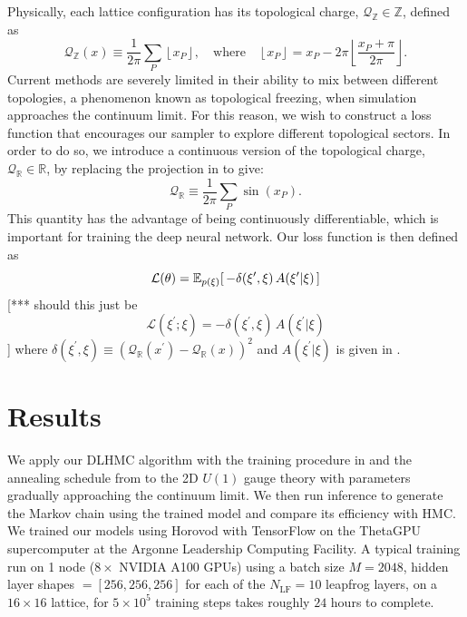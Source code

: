 \documentclass{article} %
\begin{document}
Physically, each lattice configuration has its topological charge, \(\mathcal{Q}_{\mathbb{Z}}\in\mathbb{Z}\), defined as
%
\begin{equation}
      \mathcal{Q}_{\mathbb{Z}}(x) \equiv \frac{1}{2\pi}\sum_{P}\left\lfloor x_{P}\right\rfloor,
   \quad\text{where}\quad \left\lfloor x_{P}\right\rfloor = x_{P} -
   2\pi\left\lfloor\frac{x_{P}+\pi}{2\pi}\right\rfloor.
   \label{eq:intcharge}
\end{equation}
%
Current methods are severely limited in their ability to mix between different topologies, a phenomenon known as
topological freezing, when simulation approaches the continuum limit.
%
For this reason, we wish to construct a loss function that encourages our sampler to explore different topological sectors.
%
In order to do so, we introduce a continuous version of the topological charge,
\(\mathcal{Q}_{\mathbb{R}}\in\mathbb{R}\), by replacing the projection in  to give:
%
\begin{equation}
    \mathcal{Q}_{\mathbb{R}} \equiv \frac{1}{2\pi}\sum_{P}\sin(x_{P}).
    \label{eq:sincharge}
\end{equation}
%
This quantity has the advantage of being continuously differentiable, which is important for training the deep neural
network.
%
Our loss function is then defined as
%
\begin{equation}
   \mathcal{L}(\theta) = \mathbb{E}_{p(\xi)}{%
      \left[\,-\delta(\xi^{\prime}, \xi) \, A(\xi^{\prime}|\xi)\,\right]
   }
\end{equation}
[*** should this just be
\begin{equation}
   \mathcal{L}(\xi^{\prime};\xi) = 
      -\delta(\xi^{\prime}, \xi) \, A(\xi^{\prime}|\xi)
\end{equation}
]
%
where \(\delta(\xi^{\prime}, \xi) \equiv {\left(\mathcal{Q}_{\mathbb{R}}(x^{\prime}) -
\mathcal{Q}_{\mathbb{R}}(x)\right)}^{2}\) and \(A(\xi^{\prime}|\xi)\) is given in .
%
%
\section{\label{sec:results}Results}
%
We apply our DLHMC algorithm with
the training procedure in  and the annealing schedule from 
to the 2D $U(1)$ gauge theory with parameters gradually approaching the continuum limit.
%
We then run inference to generate the Markov chain using the trained model and compare its efficiency with HMC.\@
%
We trained our models using Horovod \citep{horovod2018sergeev} with TensorFlow \citep{tensorflow2015-whitepaper} on the
ThetaGPU supercomputer at the Argonne Leadership Computing Facility.
%
A typical training run on 1 node (\(8\times\) NVIDIA A100 GPUs) using a batch size \(M=2048\), hidden layer shapes
\(=\left[256, 256, 256\right]\) for each of the \(N_{\mathrm{LF}}=10\) leapfrog layers, on a \(16\times16\) lattice, for
\(5\times10^{5}\) training steps takes roughly \(24\) hours to complete.
%
\end{document}
